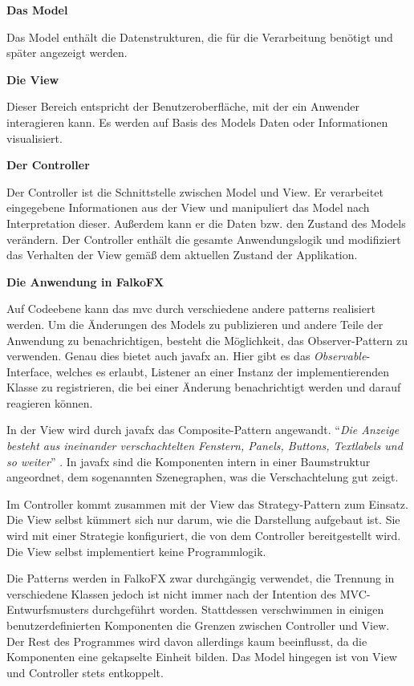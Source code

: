 \textbf{Das Model}

Das Model enthält die Datenstrukturen, die für die Verarbeitung benötigt und später angezeigt werden. \cite[S. 529ff.]{Freeman2006}

\textbf{Die View}

Dieser Bereich entspricht der Benutzeroberfläche, mit der ein Anwender interagieren kann. Es werden auf Basis des Models Daten oder Informationen visualisiert. \cite[S. 529ff.]{Freeman2006}

\textbf{Der Controller}

Der Controller ist die Schnittstelle zwischen Model und View. Er verarbeitet eingegebene Informationen aus der View und manipuliert das Model nach Interpretation dieser. Außerdem kann er die Daten bzw. den Zustand des Models verändern. Der Controller enthält die gesamte Anwendungslogik und modifiziert das Verhalten der View gemäß dem aktuellen Zustand der Applikation. \cite[S. 529ff.]{Freeman2006}

\textbf{Die Anwendung in FalkoFX}

Auf Codeebene kann das \gls{mvc} durch verschiedene andere \gls{pattern}s realisiert werden.
Um die Änderungen des Models zu publizieren und andere Teile der Anwendung zu benachrichtigen, besteht die Möglichkeit, das Observer-Pattern zu verwenden. Genau dies bietet auch \gls{javafx} an. Hier gibt es das \textit{Observable}-Interface, welches es erlaubt, Listener an einer Instanz der implementierenden Klasse zu registrieren, die bei einer Änderung benachrichtigt werden und darauf reagieren können.

In der View wird durch \gls{javafx} das Composite-Pattern angewandt. \enquote{\textit{Die Anzeige besteht aus ineinander verschachtelten Fenstern, Panels, Buttons, Textlabels und so weiter}} \cite[S. 532]{Freeman2006}. In \gls{javafx} sind die Komponenten intern in einer Baumstruktur angeordnet, dem sogenannten Szenegraphen, was die Verschachtelung gut zeigt.

Im Controller kommt zusammen mit der View das Strategy-Pattern zum Einsatz. Die View selbst kümmert sich nur darum, wie die Darstellung aufgebaut ist. Sie wird mit einer Strategie konfiguriert, die von dem Controller bereitgestellt wird. Die View selbst implementiert keine Programmlogik.

Die Patterns werden in FalkoFX zwar durchgängig verwendet, die Trennung in verschiedene Klassen jedoch ist nicht immer nach der Intention des MVC-Entwurfsmusters durchgeführt worden. Stattdessen verschwimmen in einigen benutzerdefinierten Komponenten die Grenzen zwischen Controller und View. Der Rest des Programmes wird davon allerdings kaum beeinflusst, da die Komponenten eine gekapselte Einheit bilden. Das Model hingegen ist von View und Controller stets entkoppelt.
